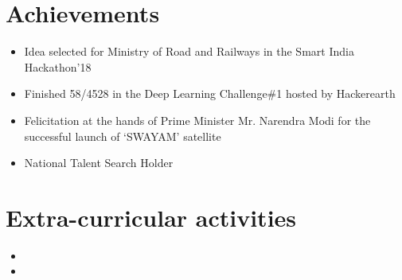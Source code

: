 \documentclass[10pt,a4paper,sans]{moderncv}        %
\begin{document}
\section{Achievements}

\vspace{3pt}

\begin{itemize}

\item{Idea selected for Ministry of Road and Railways in the Smart India Hackathon'18}
\item{Finished 58/4528 in the Deep Learning Challenge\#1 hosted by Hackerearth}
\item{Felicitation at the hands of Prime Minister Mr. Narendra Modi for the successful launch of `SWAYAM' satellite}

\item{National Talent Search Holder}




\end{itemize}

\section{Extra-curricular activities}


\vspace{4pt}
 
 \begin{itemize}

	 \item{}

	 \item{}
 \end{itemize}


 
\end{document}
